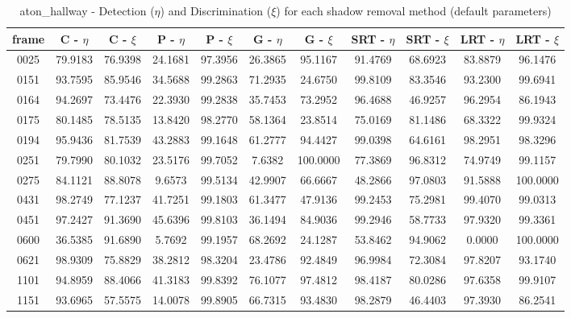 \begin{appendices}
\begin{table}
\begin{tabular}{ |c|c|c|c|c|c|c|c|c|c|c| }
\hline
\end{tabular}

\end{table}

\begin{table}
\centering
\caption{aton\_hallway - Detection ($\eta$) and Discrimination ($\xi$) for each shadow removal method (default parameters)}
\begin{tabular}{ |c|c|c|c|c|c|c|c|c|c|c| }
	\hline
\textbf{frame} &  \textbf{C - $\eta$} &  \textbf{C - $\xi$} &  \textbf{P - $\eta$} &  \textbf{P - $\xi$} &  \textbf{G - $\eta$} &  \textbf{G - $\xi$} &  \textbf{SRT - $\eta$} &  \textbf{SRT - $\xi$} &  \textbf{LRT - $\eta$} &  \textbf{LRT - $\xi$} \\
\hline
\hline
0025 &  79.9183 &  76.9398 &   24.1681 &  97.3956 &   26.3865 &  95.1167 &   91.4769 &  68.6923 &   83.8879 &  96.1476   \\
\hline
0151 &  93.7595 &  85.9546 &   34.5688 &  99.2863 &   71.2935 &  24.6750 &   99.8109 &  83.3546 &   93.2300 &  99.6941    \\
\hline
0164 &  94.2697 &  73.4476 &   22.3930 &  99.2838 &   35.7453 &  73.2952 &   96.4688 &  46.9257 &   96.2954 &  86.1943    \\
\hline
0175 &  80.1485 &  78.5135 &   13.8420 &  98.2770 &   58.1364 &  23.8514 &   75.0169 &  81.1486 &   68.3322 &  99.9324    \\
\hline
0194 &  95.9436 &  81.7539 &   43.2883 &  99.1648 &   61.2777 &  94.4427 &   99.0398 &  64.6161 &   98.2951 &  98.3296    \\
\hline
0251 &  79.7990 &  80.1032 &   23.5176 &  99.7052 &   7.6382 &  100.0000 &   77.3869 &  96.8312 &   74.9749 &  99.1157    \\
\hline
0275 &  84.1121 &  88.8078 &   9.6573 &  99.5134 &   42.9907 &  66.6667 &   48.2866 &  97.0803 &   91.5888 &  100.0000    \\
\hline
0431 &  98.2749 &  77.1237 &   41.7251 &  99.1803 &   61.3477 &  47.9136 &   99.2453 &  75.2981 &   99.4070 &  99.0313    \\
\hline
0451 &  97.2427 &  91.3690 &   45.6396 &  99.8103 &   36.1494 &  84.9036 &   99.2946 &  58.7733 &   97.9320 &  99.3361    \\
\hline
0600 &  36.5385 &  91.6890 &   5.7692 &  99.1957 &   68.2692 &  24.1287 &   53.8462 &  94.9062 &   0.0000 &  100.0000    \\
\hline
0621 &  98.9309 &  75.8829 &   38.2812 &  98.3204 &   23.4786 &  92.4849 &   96.9984 &  72.3084 &   97.8207 &  93.1740    \\
\hline
1101 &  94.8959 &  88.4066 &   41.3183 &  99.8392 &   76.1077 &  97.4812 &   98.4187 &  80.0286 &   97.6358 &  99.9107    \\
\hline
1151 &  93.6965 &  57.5575 &   14.0078 &  99.8905 &   66.7315 &  93.4830 &   98.2879 &  46.4403 &   97.3930 &  86.2541   \\


\end{tabular}
\end{table}
\end{appendices}

